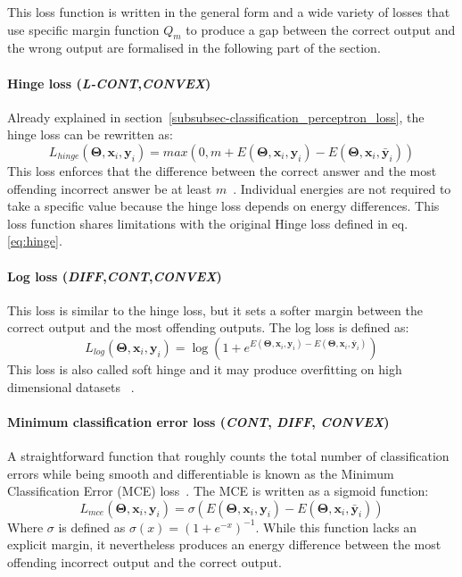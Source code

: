 \documentclass[sn-mathphys-num]{sn-jnl}%
\newcommand{\tod}[1]{{\color{magenta}\textbf{***{#1}***}}}
\newcommand \cont{\textit{CONT}}
\newcommand \lcont{\textit{L-CONT}}
\newcommand \diff{\textit{DIFF}}
\newcommand \conv{\textit{CONVEX}}
\renewcommand\vec{\mathbf}
\begin{document}
This loss function is written in the general form and a wide variety of losses that use specific margin function $Q_m$ to produce a gap between the correct output and the wrong output are formalised in the following part of the section.
\paragraph{Hinge loss (\lcont,\conv)}
Already explained in section~\ref{subsubsec-classification_perceptron_loss}, the hinge loss can be rewritten as: 
\begin{equation}
    L_{hinge}(\vec{\Theta},\vec{x}_i,\vec{y}_i) = max(0, m+ E(\vec{\Theta},\vec{x}_i,\vec{y}_i) -  E(\vec{\Theta},\vec{x}_i,\bar{\vec{y}}_i))
\end{equation}
This loss enforces that the difference between the correct answer and the most offending incorrect answer be at least $m$~\cite{taskar2003max,altun2003hidden}. Individual energies are not required to take a specific value because the hinge loss depends on energy differences.
This loss function shares limitations with the original Hinge loss defined in eq. \ref{eq:hinge}.
\paragraph{Log loss (\diff,\cont,\conv)}
This loss is similar to the hinge loss, but it sets a softer margin between the correct output and the most offending outputs. The log loss is defined as: 
\begin{equation}
    L_{log}(\vec{\Theta},\vec{x}_i,\vec{y}_i) = \log (1+e^{E(\vec{\Theta},\vec{x}_i,\vec{y}_i) -  E(\vec{\Theta},\vec{x}_i,\bar{\vec{y}}_i)})
\end{equation}
This loss is also called soft hinge and it may produce overfitting on high dimensional datasets ~\cite{kleinbaum2002logistic}.

\paragraph{Minimum classification error loss (\cont, \diff, \conv)}
A straightforward function that roughly counts the total number of classification errors while being smooth and differentiable is known as the Minimum Classification Error (MCE) loss~\cite{juang1997minimum}. The MCE is written as a sigmoid function: 
\begin{equation}
    L_{mce}(\vec{\Theta},\vec{x}_i,\vec{y}_i) = \sigma(E(\vec{\Theta},\vec{x}_i,\vec{y}_i) -  E(\vec{\Theta},\vec{x}_i,\bar{\vec{y}}_i))
\end{equation}
Where $\sigma$ is defined as $\sigma(x)=(1+e^{-x})^{-1}$. While this function lacks an explicit margin, it nevertheless produces an energy difference between the most offending incorrect output and the correct output.
\end{document}
